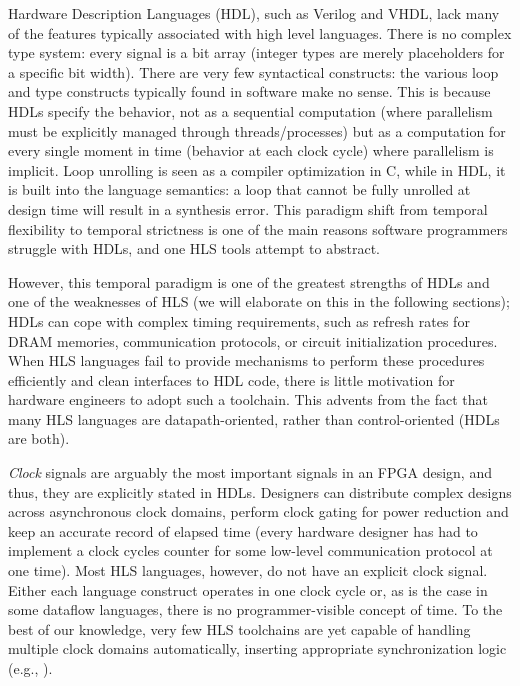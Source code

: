 Hardware Description Languages (HDL), such as Verilog and VHDL, lack many of the features typically associated with high level languages. There is no complex type system: every signal is a bit array (integer types are merely placeholders for a specific bit width). There are very few syntactical constructs: the various loop and type constructs typically found in software make no sense. This is because HDLs specify the behavior, not as a sequential computation (where parallelism must be explicitly managed through threads/processes) but as a computation for every single moment in time (behavior at each clock cycle) where parallelism is implicit. Loop unrolling is seen as a compiler optimization in C, while in HDL, it is built into the language semantics: a loop that cannot be fully unrolled at design time will result in a synthesis error. This paradigm shift from temporal flexibility to temporal strictness is one of the main reasons software programmers struggle with HDLs, and one HLS tools attempt to abstract. 
\par However, this temporal paradigm is one of the greatest strengths of HDLs and one of the weaknesses of HLS (we will elaborate on this in the following sections); HDLs can cope with complex timing requirements, such as refresh rates for DRAM memories, communication protocols, or circuit initialization procedures. When HLS languages fail to provide mechanisms to perform these procedures efficiently and clean interfaces to HDL code, there is little motivation for hardware engineers to adopt such a toolchain. This advents from the fact that many HLS languages are datapath-oriented, rather than control-oriented (HDLs are both).
\par \textit{Clock} signals are arguably the most important signals in an FPGA design, and thus, they are explicitly stated in HDLs. Designers can distribute complex designs across asynchronous clock domains, perform clock gating for power reduction and keep an accurate record of elapsed time (every hardware designer has had to implement a clock cycles counter for some low-level communication protocol at one time). Most HLS languages, however, do not have an explicit clock signal. Either each language construct operates in one clock cycle or, as is the case in some dataflow languages, there is no programmer-visible concept of time. To the best of our knowledge, very few HLS toolchains are yet capable of handling multiple clock domains automatically, inserting appropriate synchronization logic (e.g., \cite{5694295}).


